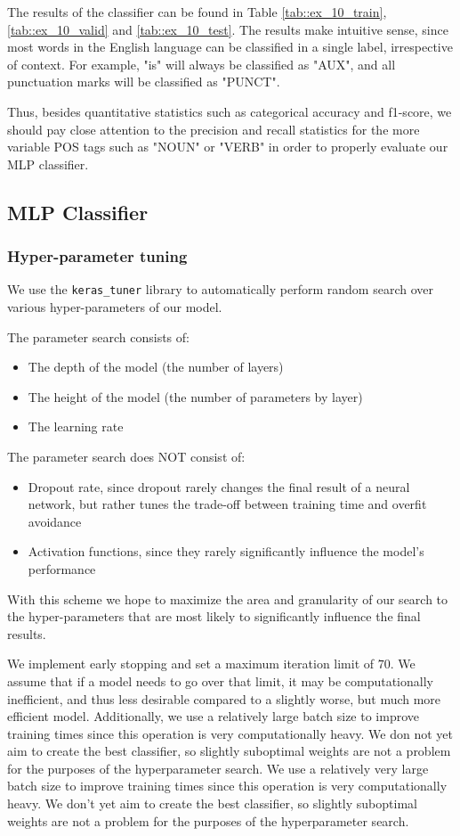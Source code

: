 \documentclass[10pt, a4paper]{article}
\begin{document}
	The results of the classifier can be found in Table \ref{tab::ex_10_train}, \ref{tab::ex_10_valid} and \ref{tab::ex_10_test}. The results make intuitive sense, since most words in the English language can be classified in a single label, irrespective of context. For example, "is" will always be classified as "AUX", and all punctuation marks will be classified as "PUNCT".
	
	Thus, besides quantitative statistics such as categorical accuracy and f1-score, we should pay close attention to the precision and recall statistics for the more variable POS tags such as "NOUN" or "VERB" in order to properly evaluate our MLP classifier.
	

	\subsection{MLP Classifier}
	
	\subsubsection{Hyper-parameter tuning}
	
	We use the \texttt{keras\_tuner} library to automatically perform random search over various hyper-parameters of our model.
	
	The parameter search consists of:
	\begin{itemize}
		\item The depth of the model (the number of layers)
		\item The height of the model (the number of parameters by layer) 
		\item The learning rate
	\end{itemize}

	
	The parameter search does NOT consist of:
	\begin{itemize}
		\item Dropout rate, since dropout rarely changes the final result of a neural network, but rather tunes the trade-off between training time and overfit avoidance
		\item Activation functions, since they rarely significantly influence the model's performance
	\end{itemize}
	
	With this scheme we hope to maximize the area and granularity of our search to the hyper-parameters that are most likely to significantly influence the final results.
	
	We implement early stopping and set a maximum iteration limit of $70$. We assume that if a model needs to go over that limit, it may be computationally inefficient, and thus less desirable compared to a slightly worse, but much more efficient model. Additionally, we use a relatively large batch size to improve training times since this operation is very computationally heavy. We don not yet aim to create the best classifier, so slightly suboptimal weights are not a problem for the purposes of the hyperparameter search.
	We use a relatively very large batch size to improve training times since this operation is very computationally heavy. We don't yet aim to create the best classifier, so slightly suboptimal weights are not a problem for the purposes of the hyperparameter search.
	
\end{document}
